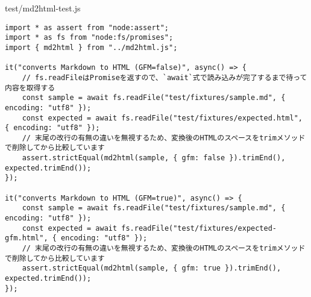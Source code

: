 \begin{listtitle}
test/md2html-test.js
\end{listtitle}
\begin{lstlisting}
import * as assert from "node:assert";
import * as fs from "node:fs/promises";
import { md2html } from "../md2html.js";

it("converts Markdown to HTML (GFM=false)", async() => {
    // fs.readFileはPromiseを返すので、`await`式で読み込みが完了するまで待って内容を取得する
    const sample = await fs.readFile("test/fixtures/sample.md", { encoding: "utf8" });
    const expected = await fs.readFile("test/fixtures/expected.html", { encoding: "utf8" });
    // 末尾の改行の有無の違いを無視するため、変換後のHTMLのスペースをtrimメソッドで削除してから比較しています
    assert.strictEqual(md2html(sample, { gfm: false }).trimEnd(), expected.trimEnd());
});

it("converts Markdown to HTML (GFM=true)", async() => {
    const sample = await fs.readFile("test/fixtures/sample.md", { encoding: "utf8" });
    const expected = await fs.readFile("test/fixtures/expected-gfm.html", { encoding: "utf8" });
    // 末尾の改行の有無の違いを無視するため、変換後のHTMLのスペースをtrimメソッドで削除してから比較しています
    assert.strictEqual(md2html(sample, { gfm: true }).trimEnd(), expected.trimEnd());
});
\end{lstlisting}
\listend
